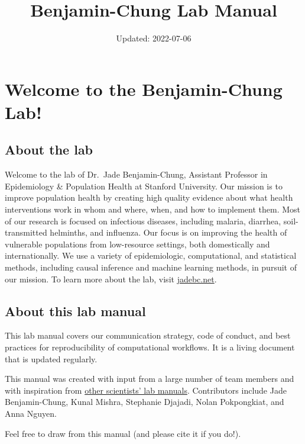 \documentclass[
]{book}
\title{Benjamin-Chung Lab Manual}
\author{}
\date{\vspace{-2.5em}Updated: 2022-07-06}
\begin{document}
\maketitle

{
\setcounter{tocdepth}{1}
\tableofcontents
}
\hypertarget{welcome-to-the-benjamin-chung-lab}{%
\chapter{Welcome to the Benjamin-Chung Lab!}\label{welcome-to-the-benjamin-chung-lab}}

\hypertarget{about-the-lab}{%
\section{About the lab}\label{about-the-lab}}

Welcome to the lab of Dr.~Jade Benjamin-Chung, Assistant Professor in Epidemiology \& Population Health at Stanford University. Our mission is to improve population health by creating high quality evidence about what health interventions work in whom and where, when, and how to implement them. Most of our research is focused on infectious diseases, including malaria, diarrhea, soil-transmitted helminths, and influenza. Our focus is on improving the health of vulnerable populations from low-resource settings, both domestically and internationally. We use a variety of epidemiologic, computational, and statistical methods, including causal inference and machine learning methods, in pursuit of our mission. To learn more about the lab, visit \href{https://jadebc.net}{jadebc.net}.

\hypertarget{about-this-lab-manual}{%
\section{About this lab manual}\label{about-this-lab-manual}}

This lab manual covers our communication strategy, code of conduct, and best practices for reproducibility of computational workflows. It is a living document that is updated regularly.

This manual was created with input from a large number of team members and with inspiration from \href{https://github.com/alylab/labmanual/blob/master/aly-lab-manual.pdf}{other scientists' lab manuals}.
Contributors include Jade Benjamin-Chung, Kunal Mishra, Stephanie Djajadi, Nolan Pokpongkiat, and Anna Nguyen.

Feel free to draw from this manual (and please cite it if you do!).
\end{document}
